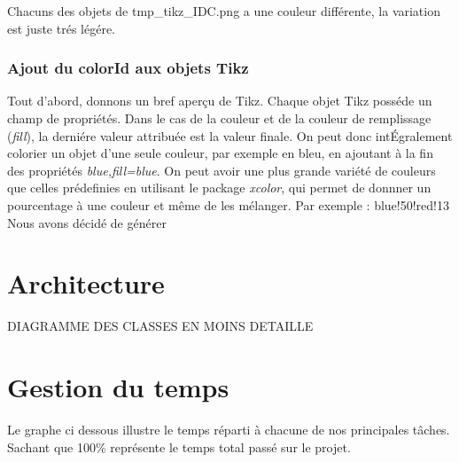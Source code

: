 \documentclass[a4paper]{report}
\begin{document}
Chacuns des objets de tmp\_tikz\_IDC.png a une couleur différente, la variation est juste trés légére.

\subsubsection{Ajout du colorId aux objets Tikz}
Tout d'abord, donnons un bref aperçu de Tikz.
Chaque objet Tikz posséde un champ de propriétés. Dans le cas de la couleur et de la couleur de  remplissage (\textit{fill}), la derniére valeur attribuée est la valeur finale.
On peut donc intÉgralement colorier un objet d'une seule couleur, par exemple en bleu, en ajoutant à la fin des propriétés \textit{blue,fill=blue}.
On peut avoir une plus grande variété de couleurs que celles prédefinies en utilisant le package \textit{xcolor}, qui permet de donnner un pourcentage à une couleur et même de les mélanger. Par exemple : blue!50!red!13
Nous avons décidé de générer 
\section{Architecture}
  DIAGRAMME DES CLASSES EN MOINS DETAILLE   
\section{Gestion du temps} 
  Le graphe ci dessous illustre le temps réparti à chacune de nos principales tâches. Sachant que 100\% représente le temps total passé sur le projet. 

\end{document}
